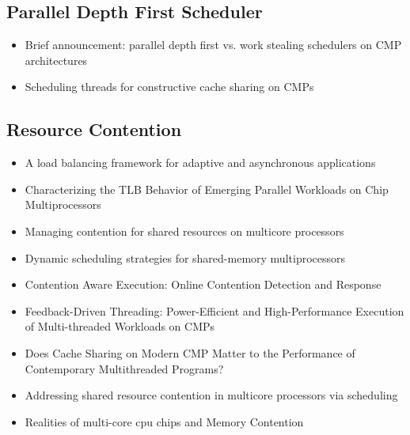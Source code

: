\subsection{Parallel Depth First Scheduler}

\begin{itemize}
\item[\textbullet] Brief announcement: parallel depth first vs. work
  stealing schedulers on CMP architectures \cite{Liaskovitis2006}
\item[\textbullet] Scheduling threads for constructive cache sharing
  on CMPs \cite{Chen2007}
\end{itemize}

\subsection{Resource Contention}

\begin{itemize}
\item[\textbullet] A load balancing framework for adaptive and
  asynchronous applications \cite{Barker2004}
\item[\textbullet] Characterizing the TLB Behavior of Emerging
  Parallel Workloads on Chip Multiprocessors \cite{Bhattacharjee2009}
\item[\textbullet] Managing contention for shared resources on
  multicore processors \cite{Fedorova2010}
\item[\textbullet] Dynamic scheduling strategies for shared-memory
  multiprocessors \cite{Hamidzadeh1996}
\item[\textbullet] Contention Aware Execution: Online Contention
  Detection and Response \cite{Mars2010}
\item[\textbullet] Feedback-Driven Threading: Power-Efficient and
  High-Performance Execution of Multi-threaded Workloads on CMPs
  \cite{Suleman2008}
\item[\textbullet] Does Cache Sharing on Modern CMP Matter to the
  Performance of Contemporary Multithreaded Programs? \cite{Zhang2010}
\item[\textbullet] Addressing shared resource contention in multicore
  processors via scheduling \cite{Zhuravlev2010}
\item[\textbullet] Realities of multi-core cpu chips and Memory
  Contention \cite{Barker2009}
\end{itemize}





